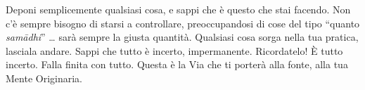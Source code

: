 Deponi semplicemente qualsiasi cosa, e sappi che è questo che stai
facendo. Non c'è sempre bisogno di starsi a controllare, preoccupandosi
di cose del tipo ``quanto \emph{samādhi}'' \ldots{} sarà sempre la giusta
quantità. Qualsiasi cosa sorga nella tua pratica, lasciala andare. Sappi
che tutto è incerto, impermanente. Ricordatelo! È tutto incerto. Falla
finita con tutto. Questa è la Via che ti porterà alla fonte, alla tua
Mente Originaria.

